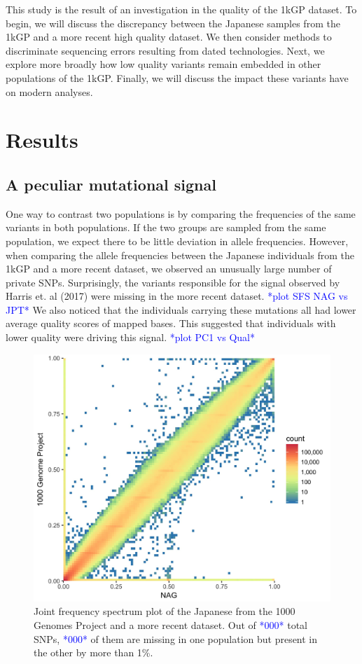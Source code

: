 \documentclass[]{elife}
\newcommand{\todo}[1]{\textcolor{blue}{*#1*}}
\begin{document}
This study is the result of an investigation in the quality of the 1kGP dataset.
To begin, we will discuss the discrepancy between the Japanese samples from the 1kGP and a more recent high quality dataset. 
We then consider methods to discriminate sequencing errors resulting from dated technologies.
Next, we explore more broadly how low quality variants remain embedded in other populations of the 1kGP.
Finally, we will discuss the impact these variants have on modern analyses.

			\section{Results}
	\subsection{A peculiar mutational signal}			
One way to contrast two populations is by comparing the frequencies of the same variants in both populations.
If the two groups are sampled from the same population, we expect there to be little deviation in allele frequencies.
However, when comparing the allele frequencies between the Japanese individuals from the 1kGP and a more recent dataset, we observed an unusually large number of private SNPs.
Surprisingly, the variants responsible for the signal observed by Harris et. al (2017) were missing in the more recent dataset. 
\todo{plot SFS NAG vs JPT}
We also noticed that the individuals carrying these mutations all had lower average quality scores of mapped bases.
This suggested that individuals with lower quality were driving this signal.
\todo{plot PC1 vs Qual}

\begin{figure}
\includegraphics[width=\hsize,keepaspectratio]{NAG_JPT_SFS_GenomeWide.jpg}
\caption{Joint frequency spectrum plot of the Japanese from the 1000 Genomes Project and a more recent dataset. Out of \todo{000} total SNPs, \todo{000} of them are missing in one population but present in the other by more than 1\%.}
 \label{SFS}
\end{figure}
\end{document}
